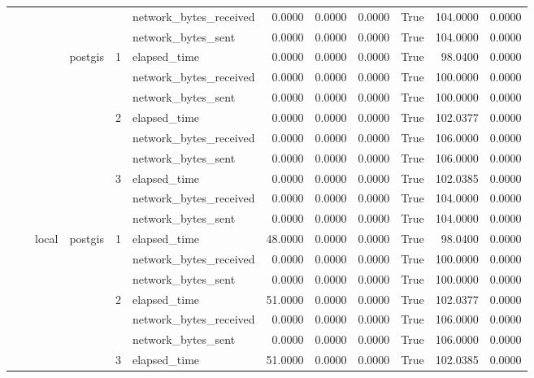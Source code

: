 \begin{tabular}{llllllrrrrrr}
 &  &  &  &  & network_bytes_received & 0.0000 & 0.0000 & 0.0000 & True & 104.0000 & 0.0000 \\
 &  &  &  &  & network_bytes_sent & 0.0000 & 0.0000 & 0.0000 & True & 104.0000 & 0.0000 \\
\cline{4-12} \cline{5-12}
 &  &  & \multirow[t]{9}{*}{postgis} & \multirow[t]{3}{*}{1} & elapsed_time & 0.0000 & 0.0000 & 0.0000 & True & 98.0400 & 0.0000 \\
 &  &  &  &  & network_bytes_received & 0.0000 & 0.0000 & 0.0000 & True & 100.0000 & 0.0000 \\
 &  &  &  &  & network_bytes_sent & 0.0000 & 0.0000 & 0.0000 & True & 100.0000 & 0.0000 \\
\cline{5-12}
 &  &  &  & \multirow[t]{3}{*}{2} & elapsed_time & 0.0000 & 0.0000 & 0.0000 & True & 102.0377 & 0.0000 \\
 &  &  &  &  & network_bytes_received & 0.0000 & 0.0000 & 0.0000 & True & 106.0000 & 0.0000 \\
 &  &  &  &  & network_bytes_sent & 0.0000 & 0.0000 & 0.0000 & True & 106.0000 & 0.0000 \\
\cline{5-12}
 &  &  &  & \multirow[t]{3}{*}{3} & elapsed_time & 0.0000 & 0.0000 & 0.0000 & True & 102.0385 & 0.0000 \\
 &  &  &  &  & network_bytes_received & 0.0000 & 0.0000 & 0.0000 & True & 104.0000 & 0.0000 \\
 &  &  &  &  & network_bytes_sent & 0.0000 & 0.0000 & 0.0000 & True & 104.0000 & 0.0000 \\
\cline{3-12} \cline{4-12} \cline{5-12}
 &  & \multirow[t]{9}{*}{local} & \multirow[t]{9}{*}{postgis} & \multirow[t]{3}{*}{1} & elapsed_time & 48.0000 & 0.0000 & 0.0000 & True & 98.0400 & 0.0000 \\
 &  &  &  &  & network_bytes_received & 0.0000 & 0.0000 & 0.0000 & True & 100.0000 & 0.0000 \\
 &  &  &  &  & network_bytes_sent & 0.0000 & 0.0000 & 0.0000 & True & 100.0000 & 0.0000 \\
\cline{5-12}
 &  &  &  & \multirow[t]{3}{*}{2} & elapsed_time & 51.0000 & 0.0000 & 0.0000 & True & 102.0377 & 0.0000 \\
 &  &  &  &  & network_bytes_received & 0.0000 & 0.0000 & 0.0000 & True & 106.0000 & 0.0000 \\
 &  &  &  &  & network_bytes_sent & 0.0000 & 0.0000 & 0.0000 & True & 106.0000 & 0.0000 \\
\cline{5-12}
 &  &  &  & \multirow[t]{3}{*}{3} & elapsed_time & 51.0000 & 0.0000 & 0.0000 & True & 102.0385 & 0.0000 \\

\end{tabular}
